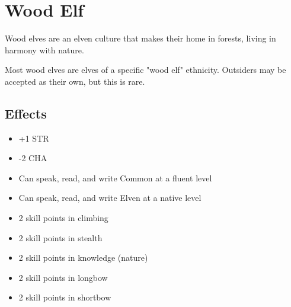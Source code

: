 \section{Wood Elf}\label{culture:wood-elf}
Wood elves are an elven culture that makes their home in forests, living
in harmony with nature.

Most wood elves are elves of a specific "wood elf" ethnicity. Outsiders may be
accepted as their own, but this is rare.

\subsection*{Effects}
\begin{itemize}
    \item +1 STR
    \item -2 CHA
    \item Can speak, read, and write Common at a fluent level
    \item Can speak, read, and write Elven at a native level
    \item 2 skill points in climbing
    \item 2 skill points in stealth
    \item 2 skill points in knowledge (nature)
    \item 2 skill points in longbow
    \item 2 skill points in shortbow
\end{itemize}
